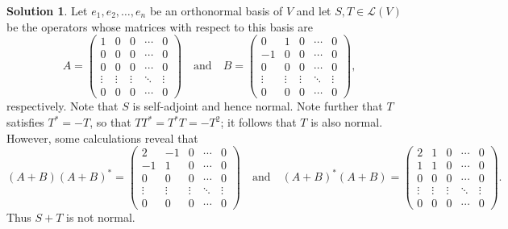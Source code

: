 \documentclass[12pt]{article}
\theoremstyle{definition}
\theoremstyle{exercise}
\theoremstyle{solution}
\newtheorem*{solution}{Solution}
\newcommand{\lmap}{\mathcal{L}}
\newcommand{\quand}{\quad \text{and} \quad}
\begin{document}
\begin{solution}
    Let \( e_1, e_2, \ldots, e_n \) be an orthonormal basis of \( V \) and let \( S, T \in \lmap(V) \) be the operators whose matrices with respect to this basis are
    \[
        A = \begin{pmatrix}
            1 & 0 & 0 & \cdots & 0 \\
            0 & 0 & 0 & \cdots & 0 \\
            0 & 0 & 0 & \cdots & 0 \\
            \vdots & \vdots & \vdots & \ddots & \vdots \\
            0 & 0 & 0 & \cdots & 0
        \end{pmatrix}
        \quand
        B = \begin{pmatrix}
            0 & 1 & 0 & \cdots & 0 \\
            -1 & 0 & 0 & \cdots & 0 \\
            0 & 0 & 0 & \cdots & 0 \\
            \vdots & \vdots & \vdots & \ddots & \vdots \\
            0 & 0 & 0 & \cdots & 0
        \end{pmatrix},
    \]
    respectively. Note that \( S \) is self-adjoint and hence normal. Note further that \( T \) satisfies \( T^* = -T \), so that \( TT^* = T^*T = -T^2 \); it follows that \( T \) is also normal. However, some calculations reveal that
    \[
        (A + B)(A + B)^* = \begin{pmatrix}
            2 & -1 & 0 & \cdots & 0 \\
            -1 & 1 & 0 & \cdots & 0 \\
            0 & 0 & 0 & \cdots & 0 \\
            \vdots & \vdots & \vdots & \ddots & \vdots \\
            0 & 0 & 0 & \cdots & 0
        \end{pmatrix}
        \quand
        (A + B)^*(A + B) = \begin{pmatrix}
            2 & 1 & 0 & \cdots & 0 \\
            1 & 1 & 0 & \cdots & 0 \\
            0 & 0 & 0 & \cdots & 0 \\
            \vdots & \vdots & \vdots & \ddots & \vdots \\
            0 & 0 & 0 & \cdots & 0
        \end{pmatrix}.
    \]
    Thus \( S + T \) is not normal.
\end{solution}
\end{document}
